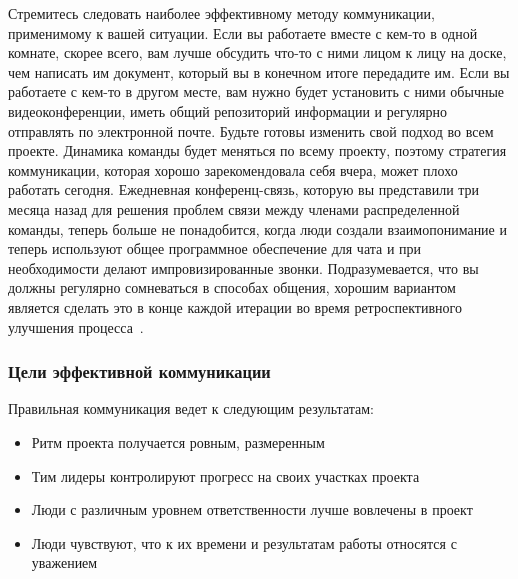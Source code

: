 \documentclass{../industrial-development}
\begin{document}
\lecturenotes

Стремитесь следовать наиболее эффективному методу коммуникации, применимому к вашей ситуации. Если вы работаете вместе с кем-то в одной комнате, скорее всего, вам лучше обсудить что-то с ними лицом к лицу на доске, чем написать им документ, который вы в конечном итоге передадите им. Если вы работаете с кем-то в другом месте, вам нужно будет установить с ними обычные видеоконференции, иметь общий репозиторий информации и регулярно отправлять по электронной почте.
Будьте готовы изменить свой подход во всем проекте. Динамика команды будет меняться по всему проекту, поэтому стратегия коммуникации, которая хорошо зарекомендовала себя вчера, может плохо работать сегодня. Ежедневная конференц-связь, которую вы представили три месяца назад для решения проблем связи между членами распределенной команды, теперь больше не понадобится, когда люди создали взаимопонимание и теперь используют общее программное обеспечение для чата и при необходимости делают импровизированные звонки. Подразумевается, что вы должны регулярно сомневаться в способах общения, хорошим вариантом является сделать это в конце каждой итерации во время ретроспективного улучшения процесса~\cite{AgileComm}.


\begin{frame} \frametitle{Цели эффективной коммуникации}
	Правильная коммуникация ведет к следующим результатам:
	\begin{itemize}
		\item Ритм проекта получается ровным, размеренным
		\item Тим лидеры контролируют прогресс на своих участках проекта
		\item Люди с различным уровнем ответственности лучше вовлечены в проект
		\item Люди чувствуют, что к их времени и результатам работы относятся с уважением
	\end{itemize}
\end{frame}
\end{document}
